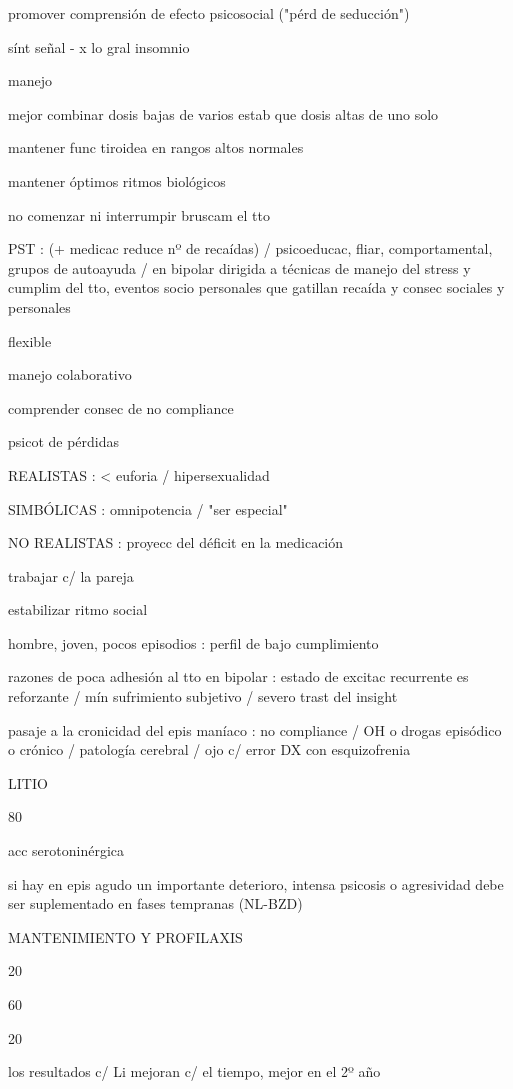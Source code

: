 \documentclass{scrbook}
\begin{document}
promover comprensión de efecto psicosocial ("pérd de seducción")

sínt señal - x lo gral insomnio

manejo

mejor combinar dosis bajas de varios estab que dosis altas de uno solo

mantener func tiroidea en rangos altos normales

mantener óptimos ritmos biológicos

no comenzar ni interrumpir bruscam el tto

PST : (+ medicac reduce nº de recaídas) / psicoeducac, fliar, comportamental, grupos de autoayuda / en bipolar dirigida a técnicas de manejo del stress y cumplim del tto, eventos socio personales que gatillan recaída y consec sociales y personales

flexible

manejo colaborativo

comprender consec de no compliance

psicot de pérdidas

REALISTAS : < euforia / hipersexualidad

SIMBÓLICAS : omnipotencia / "ser especial"

NO REALISTAS : proyecc del déficit en la medicación

trabajar c/ la pareja

estabilizar ritmo social

hombre, joven, pocos episodios : perfil de bajo cumplimiento

razones de poca adhesión al tto en bipolar : estado de excitac recurrente es reforzante / mín sufrimiento subjetivo / severo trast del insight

pasaje a la cronicidad del epis maníaco : no compliance / OH o drogas episódico o crónico / patología cerebral / ojo c/ error DX con esquizofrenia

LITIO

80%

acc serotoninérgica

si hay en epis agudo un importante deterioro, intensa psicosis o agresividad debe ser suplementado en fases tempranas (NL-BZD)

MANTENIMIENTO Y PROFILAXIS

20 %

60 %

20 %

los resultados c/ Li mejoran c/ el tiempo, mejor en el 2º año
\end{document}
